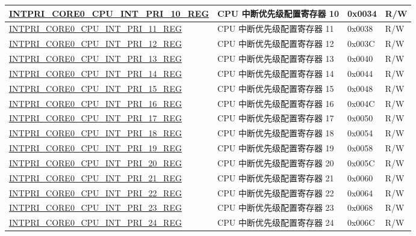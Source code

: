 \begin{longtable}{ | p{10cm} | p{10cm} | p{1.3cm} | p{1cm} | }
\hyperref[regdesc:INTPRICORE0CPUINTPRINREG]{INTPRI\_CORE0\_CPU\_INT\_PRI\_10\_REG} & CPU 中断优先级配置寄存器 10 & 0x0034 & R/W \\ \hline
\hyperref[regdesc:INTPRICORE0CPUINTPRINREG]{INTPRI\_CORE0\_CPU\_INT\_PRI\_11\_REG} & CPU 中断优先级配置寄存器 11 & 0x0038 & R/W \\ \hline
\hyperref[regdesc:INTPRICORE0CPUINTPRINREG]{INTPRI\_CORE0\_CPU\_INT\_PRI\_12\_REG} & CPU 中断优先级配置寄存器 12 & 0x003C & R/W \\ \hline
\hyperref[regdesc:INTPRICORE0CPUINTPRINREG]{INTPRI\_CORE0\_CPU\_INT\_PRI\_13\_REG} & CPU 中断优先级配置寄存器 13 & 0x0040 & R/W \\ \hline
\hyperref[regdesc:INTPRICORE0CPUINTPRINREG]{INTPRI\_CORE0\_CPU\_INT\_PRI\_14\_REG} & CPU 中断优先级配置寄存器 14 & 0x0044 & R/W \\ \hline
\hyperref[regdesc:INTPRICORE0CPUINTPRINREG]{INTPRI\_CORE0\_CPU\_INT\_PRI\_15\_REG} & CPU 中断优先级配置寄存器 15 & 0x0048 & R/W \\ \hline
\hyperref[regdesc:INTPRICORE0CPUINTPRINREG]{INTPRI\_CORE0\_CPU\_INT\_PRI\_16\_REG} & CPU 中断优先级配置寄存器 16 & 0x004C & R/W \\ \hline
\hyperref[regdesc:INTPRICORE0CPUINTPRINREG]{INTPRI\_CORE0\_CPU\_INT\_PRI\_17\_REG} & CPU 中断优先级配置寄存器 17 & 0x0050 & R/W \\ \hline
\hyperref[regdesc:INTPRICORE0CPUINTPRINREG]{INTPRI\_CORE0\_CPU\_INT\_PRI\_18\_REG} & CPU 中断优先级配置寄存器 18 & 0x0054 & R/W \\ \hline
\hyperref[regdesc:INTPRICORE0CPUINTPRINREG]{INTPRI\_CORE0\_CPU\_INT\_PRI\_19\_REG} & CPU 中断优先级配置寄存器 19 & 0x0058 & R/W \\ \hline
\hyperref[regdesc:INTPRICORE0CPUINTPRINREG]{INTPRI\_CORE0\_CPU\_INT\_PRI\_20\_REG} & CPU 中断优先级配置寄存器 20 & 0x005C & R/W \\ \hline
\hyperref[regdesc:INTPRICORE0CPUINTPRINREG]{INTPRI\_CORE0\_CPU\_INT\_PRI\_21\_REG} & CPU 中断优先级配置寄存器 21 & 0x0060 & R/W \\ \hline
\hyperref[regdesc:INTPRICORE0CPUINTPRINREG]{INTPRI\_CORE0\_CPU\_INT\_PRI\_22\_REG} & CPU 中断优先级配置寄存器 22 & 0x0064 & R/W \\ \hline
\hyperref[regdesc:INTPRICORE0CPUINTPRINREG]{INTPRI\_CORE0\_CPU\_INT\_PRI\_23\_REG} & CPU 中断优先级配置寄存器 23 & 0x0068 & R/W \\ \hline
\hyperref[regdesc:INTPRICORE0CPUINTPRINREG]{INTPRI\_CORE0\_CPU\_INT\_PRI\_24\_REG} & CPU 中断优先级配置寄存器 24 & 0x006C & R/W \\ \hline

\end{longtable}
